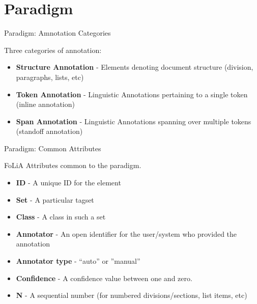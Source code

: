 \documentclass[compress]{beamer}
\begin{document}
\section{Paradigm}

\begin{frame}
    \begin{block}{Paradigm: Amnotation Categories}
            
        
        Three categories of annotation:    
        \begin{itemize}            
            \item \textbf{Structure Annotation} - Elements denoting document structure (division, paragraphs, lists, etc)
            \item \textbf{Token Annotation} - Linguistic Annotations pertaining to a single token (inline annotation)
            \item \textbf{Span Annotation} - Linguistic Annotations spanning over multiple tokens (standoff annotation)
        \end{itemize}
            
    \end{block}
\end{frame}

        
\begin{frame}
    \begin{block}{Paradigm: Common Attributes}
            
        FoLiA Attributes common to the paradigm.
        \begin{itemize}
            \item \textbf{ID} - A unique ID for the element
            \item \textbf{Set} - A particular tagset
            \item \textbf{Class} - A class in such a set
            \item \textbf{Annotator} - An open identifier for the user/system who provided the annotation
            \item \textbf{Annotator type} - ``auto'' or ''manual''
            \item \textbf{Confidence} - A confidence value between one and zero.
            \item \textbf{N} - A sequential number (for numbered divisions/sections, list items, etc)            
        \end{itemize}
            
    \end{block}
\end{frame}
\end{document}
